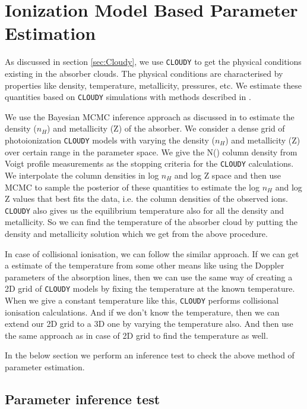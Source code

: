 \section{Ionization Model Based Parameter Estimation}  \label{sec:param-estimation}

As discussed in section \ref{sec:Cloudy}, we use {\tt CLOUDY} to get the physical conditions existing in the absorber clouds. The physical conditions are characterised by properties like density, temperature, metallicity, pressures, etc. We estimate these quantities based on {\tt CLOUDY} simulations with methods described in \citet{acharya_khaire}.

We use the Bayesian MCMC inference approach as discussed in \citet{acharya_khaire} to estimate the density ($n_H$) and metallicity (Z) of the absorber. We consider a dense grid of photoionization {\tt CLOUDY} models with varying the density ($n_H$) and metallicity (Z) over certain range in the parameter space. We give the N() column density from Voigt profile measurements as the stopping criteria for the {\tt CLOUDY} calculations. We interpolate the column densities in log $n_H$ and log Z space and then use MCMC to sample the posterior of these quantities to estimate the log $n_H$ and log Z values that best fits the data, i.e. the column densities of the observed ions. {\tt CLOUDY} also gives us the equilibrium temperature also for all the density and metallicity. So we can find the temperature of the absorber cloud by putting the density and metallicity solution which we get from the above procedure. 

In case of collisional ionisation, we can follow the similar approach. If we can get a estimate of the temperature from some other means like using the Doppler parameters of the absorption lines, then we can use the same way of creating a 2D grid of {\tt CLOUDY} models by fixing the temperature at the known temperature. When we give a constant temperature like this, {\tt CLOUDY} performs collisional ionisation calculations. And if we don't know the temperature, then we can extend our 2D grid to a 3D one by varying the temperature also. And then use the same approach as in case of 2D grid to find the temperature as well.

In the below section we perform an inference test to check the above method of parameter estimation.


\subsection{Parameter inference test}


